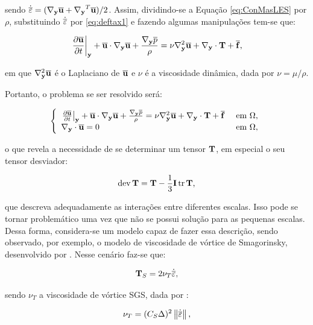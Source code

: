 \documentclass[_ArquivoPrincipal.tex]{subfiles}
\begin{document}
\noindent sendo $\dot{\overline{\mathbf{\varepsilon}}}=(\mathbf{\nabla_y}\overline{\mathbf{u}}+\mathbf{\nabla_y}^T\overline{\mathbf{u}})/2$. Assim, dividindo-se a Equação \ref{eq:ConMasLES} por $\rho$, substituindo $\dot{\overline{\mathbf{\varepsilon}}}$ por \ref{eq:deftax1} e fazendo algumas manipulações tem-se que:

\begin{equation}
    \left.\frac{\partial{\overline{\mathbf{u}}}}{\partial{t}}\right|_{\mathbf{y}}+\overline{\mathbf{u}}\cdot\mathbf{\nabla_y}\overline{\mathbf{u}}+\frac{\mathbf{\nabla_y} \overline{p}}{\rho}=\nu\mathbf{\nabla}^2_\mathbf{y}\overline{\mathbf{u}}+\mathbf{\nabla_y}\cdot\mathbf{T}+\overline{\mathbf{f}}\text{,}
\end{equation}

\noindent em que $\mathbf{\nabla}^2_\mathbf{y}\overline{\mathbf{u}}$ é o Laplaciano de $\overline{\mathbf{u}}$ e $\nu$ é a viscosidade dinâmica, dada por $\nu=\mu/\rho$.

Portanto, o problema se ser resolvido será:

\begin{equation}
    \left\{
   \begin{array}{ll}
        \left.\frac{\partial{\overline{\mathbf{u}}}}{\partial{t}}\right|_{\mathbf{y}}+\overline{\mathbf{u}}\cdot\mathbf{\nabla_y}\overline{\mathbf{u}}+\frac{\mathbf{\nabla_y} \overline{p}}{\rho}=\nu\mathbf{\nabla}^2_\mathbf{y}\overline{\mathbf{u}}+\mathbf{\nabla_y}\cdot\mathbf{T}+\overline{\mathbf{f}}&\text{ em }\Omega\text{,}\\
        \mathbf{\nabla_y}\cdot\overline{\mathbf{u}}=0&\text{ em }\Omega\text{,}
    \end{array}
    \right.
\end{equation}

\noindent o que revela a necessidade de se determinar um tensor $\mathbf{T}$, em especial o seu tensor desviador:

\begin{equation}
    \mathop{\mathrm{dev}}\nolimits{\mathbf{T}}=\mathbf{T}-\frac{1}{3}\mathbf{I}\mathop{\mathrm{tr}}\nolimits{\mathbf{T}}\text{,}
\end{equation}

\noindent que descreva adequadamente as interações entre diferentes escalas. Isso pode se tornar problemático uma vez que não se possui solução para as pequenas escalas. Dessa forma, considera-se um modelo capaz de fazer essa descrição, sendo observado, por exemplo, o modelo de viscosidade de vórtice de Smagorinsky, desenvolvido por . Nesse cenário faz-se que:

\begin{equation}
    \mathbf{T}_S=2\nu_T\dot{\overline{\mathbf{\varepsilon}}}\text{,}
\end{equation}

\noindent sendo $\nu_T$ a viscosidade de vórtice SGS, dada por \cite{germano1991dynamic,piomelli1999large,hughes2000large}:

\begin{equation}
    \nu_T=(C_S\Delta)^2\left\lVert{\dot{\overline{\mathbf{\varepsilon}}}}\right\lVert\text{,}
\end{equation}
\end{document}
